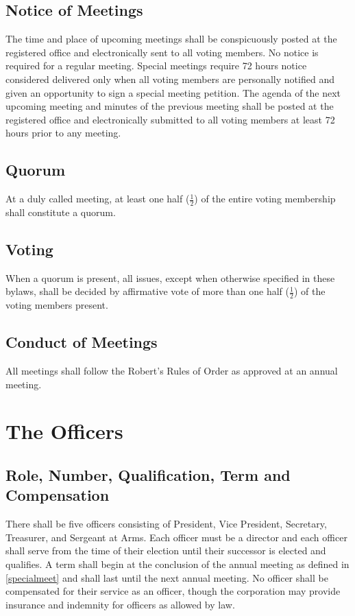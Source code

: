 \documentclass[10pt,letterpaper,titlepage]{article}
\begin{document}
\subsection{Notice of Meetings}

The time and place of upcoming meetings shall be conspicuously posted at the
registered office and electronically sent to all voting members.
No notice is required for a regular meeting.
Special meetings require 72 hours notice considered delivered only when all
voting members are personally notified and given an opportunity to sign a
special meeting petition.
The agenda of the next upcoming meeting and minutes of the previous meeting
shall be posted at the registered office and electronically submitted to all
voting members at least 72 hours prior to any meeting.

\subsection{Quorum}

At a duly called meeting, at least one half ($\frac{1}{2}$) of the entire voting
membership shall constitute a quorum.

\subsection{Voting}

When a quorum is present, all issues, except when otherwise specified in these
bylaws, shall be decided by affirmative vote of more than one half ($\frac{1}{2}$)
of the voting members present.

\subsection{Conduct of Meetings}
\label{condofmeet}

All meetings shall follow the Robert's Rules of Order as approved at an annual
meeting.


\section{The Officers}
\label{officers}

\subsection{Role, Number, Qualification, Term and Compensation}

There shall be five officers consisting of President, Vice President,
Secretary, Treasurer, and Sergeant at Arms.
Each officer must be a director and each officer shall serve from the time of
their election until their successor is elected and qualifies.
A term shall begin at the conclusion of the annual meeting as defined in
\ref{specialmeet} and shall last until the next annual meeting.
No officer shall be compensated for their service as an officer, though the
corporation may provide insurance and indemnity for officers as allowed by law.
\end{document}

